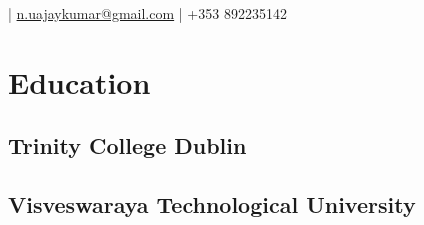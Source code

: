 \documentclass[]{openfont}
\begin{document}
%
%
\lastupdated

%
%

 { 
\href{https://ajaykumar.ie}{} |
\href{mailto:n.uajaykumar@gmail.com}{\emailsymbol{}n.uajaykumar@gmail.com} | 
\mobilephonesymbol{}+353 892235142 \linebreak
\locationsymbol{}\address{Galway, Ireland}
}

%
%

\begin{minipage}[t]{0.33\textwidth} 


\section{Education} 

\subsection{Trinity College Dublin}
\sectionsep

\subsection{Visveswaraya Technological University}
\sectionsep




\end{minipage}
\end{document}
